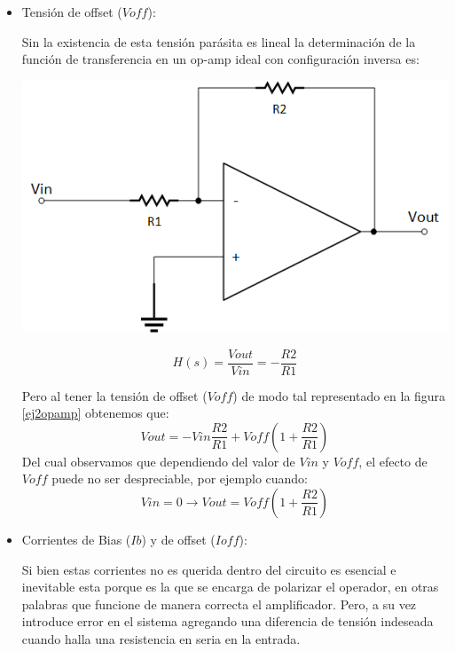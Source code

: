 \begin{itemize}
    \item Tensión de offset ($Voff$): 
    
    Sin la existencia de esta tensión parásita es lineal la determinación de la función de transferencia en un op-amp ideal con configuración inversa es:
    
    \begin{minipage}{.45\textwidth}
        \centering
        \includegraphics[scale = 0.5]{inversopamp.png}
    \end{minipage}
    \begin{minipage}{.45\textwidth}
        $$H(s) = \frac{Vout}{Vin} = -\frac{R2}{R1}$$
    \end{minipage}

    Pero al tener la tensión de offset ($Voff$) de modo tal representado en la figura \ref{ej2opamp} obtenemos que:
    $$Vout = -Vin\frac{R2}{R1} + Voff\left(1 + \frac{R2}{R1}\right)$$
    Del cual observamos que dependiendo del valor de $Vin$ y $Voff$, el efecto de $Voff$ puede no ser despreciable, por ejemplo cuando:
    $$Vin = 0 \longrightarrow Vout = Voff \left(1 + \frac{R2}{R1}\right)$$
    
    \item Corrientes de Bias ($Ib$) y de offset ($Ioff$):
    
    Si bien estas corrientes no es querida dentro del circuito es esencial e inevitable esta porque es la que se encarga de polarizar el operador, en otras palabras que funcione de manera correcta el amplificador. Pero, a su vez introduce error en el sistema agregando una diferencia de tensión indeseada cuando halla una resistencia en seria en la entrada.
    
\end{itemize}


